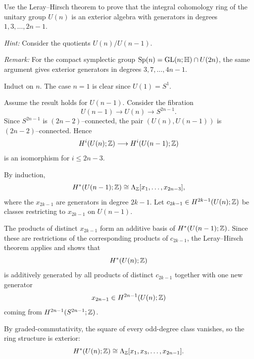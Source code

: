 \documentclass[12pt]{article}  %
\begin{document}
\begin{problem}[6]
Use the Leray--Hirsch theorem to prove that the integral cohomology ring of the unitary group $U(n)$
is an exterior algebra with generators in degrees $1,3,\dots,2n-1$.

\noindent\textit{Hint:} Consider the quotients $U(n)/U(n-1)$.

\noindent\textit{Remark:} For the compact symplectic group $\operatorname{Sp}(n)=\operatorname{GL}(n;\mathbb{H})\cap U(2n)$, the same argument gives
exterior generators in degrees $3,7,\dots,4n-1$.
\end{problem}

\begin{solution}
Induct on $n$. The case $n=1$ is clear since
$U(1)=S^1$.

Assume the result holds for $U(n-1)$.
Consider the fibration
\[
U(n-1)\longrightarrow U(n)\longrightarrow S^{2n-1}.
\]
Since $S^{2n-1}$ is $(2n-2)$--connected, the pair
$(U(n),U(n-1))$ is $(2n-2)$--connected.
Hence
\[
H^i(U(n);\mathbb{Z})\longrightarrow H^i(U(n-1);\mathbb{Z})
\]
is an isomorphism for $i\le 2n-3$.

By induction,
\[
H^*(U(n-1);\mathbb{Z})
\cong
\Lambda_{\mathbb{Z}}[x_1,\dots,x_{2n-3}],
\]
where the $x_{2k-1}$ are generators in degree $2k-1$.
Let $c_{2k-1}\in H^{2k-1}(U(n);\mathbb{Z})$ be classes restricting to
$x_{2k-1}$ on $U(n-1)$.

The products of distinct $x_{2k-1}$ form an additive basis of
$H^*(U(n-1);\mathbb{Z})$.
Since these are restrictions of the corresponding products of
$c_{2k-1}$, the Leray--Hirsch theorem applies and shows that
\[
H^*(U(n);\mathbb{Z})
\]
is additively generated by all products of distinct
$c_{2k-1}$ together with one new generator
\[
x_{2n-1}\in H^{2n-1}(U(n);\mathbb{Z})
\]
coming from $H^{2n-1}(S^{2n-1};\mathbb{Z})$.

By graded-commutativity, the square of every odd-degree class vanishes,
so the ring structure is exterior:
\[
H^*(U(n);\mathbb{Z})
\cong
\Lambda_{\mathbb{Z}}[x_1,x_3,\dots,x_{2n-1}].
\]
\end{solution}
\end{document}
